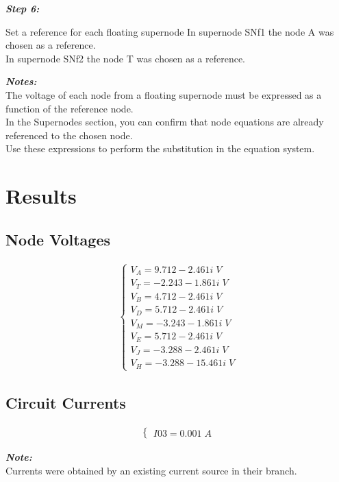 \documentclass[a4paper]{article}
\begin{document}
\begin{small}\textbf{\textit{Step 6:}}\end{small} Set a reference for each floating supernode
\newline
In supernode SNf1 the node A was chosen as a reference. \\
In supernode SNf2 the node T was chosen as a reference.

\newline
\begin{footnotesize}
\textbf{\textit{Notes:}} \\
The voltage of each node from a floating supernode must be expressed as a function of the reference node. \\
In the Supernodes section, you can confirm that node equations are already referenced to the chosen node. \\
Use these expressions to perform the substitution in the equation system.
\end{footnotesize}


\par

\newpage

\section{Results}

\subsection{Node Voltages}
\begin{gather*}
\begin{cases}V_{A} = 9.712-2.461i\;V \\[0.7em] V_{T} = -2.243-1.861i\;V \\[0.7em] V_{B} = 4.712-2.461i\;V \\[0.7em] V_{D} = 5.712-2.461i\;V \\[0.7em] V_{M} = -3.243-1.861i\;V \\[0.7em] V_{E} = 5.712-2.461i\;V \\[0.7em] V_{J} = -3.288-2.461i\;V \\[0.7em] V_{H} = -3.288-15.461i\;V\end{cases}
\end{gather*}

\subsection{Circuit Currents}
\begin{gather*}
\begin{cases}I03 = 0.001\;A\end{cases}
\end{gather*}
\begin{footnotesize}
\textbf{\textit{Note:}} \\
 Currents were obtained by an existing current source in their branch.
\end{footnotesize}
\end{document}
